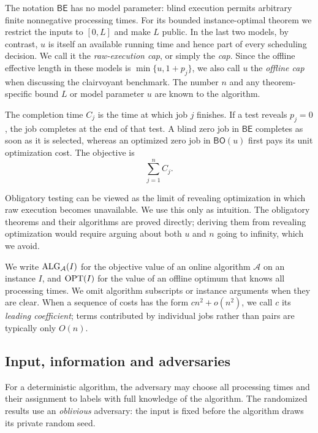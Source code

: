 The notation $\mathsf{BE}$ has no model parameter: blind execution permits
arbitrary finite nonnegative processing times.  For its bounded
instance-optimal theorem we restrict the inputs to $[0,L]$ and make $L$
public.  In the last two models, by contrast, $u$ is itself an available
running time and hence part of every scheduling decision.  We call it the
\emph{raw-execution cap}, or simply the \emph{cap}.  Since the offline
effective length in these models is $\min\{u,1+p_j\}$, we also call $u$ the
\emph{offline cap} when discussing the clairvoyant benchmark.  The
number $n$
and any theorem-specific bound $L$ or model parameter $u$ are known to the
algorithm.

The completion time $C_j$ is the time at which job $j$ finishes.  If a test
reveals $p_j=0$, the job completes at the end of that test.  A blind zero job
in $\mathsf{BE}$ completes as soon as it is selected, whereas an optimized
zero job in $\mathsf{BO}(u)$ first pays its unit optimization cost.  The
objective is
\[
                              \sum_{j=1}^n C_j.
\]

Obligatory testing can be viewed as the limit of revealing optimization in
which raw execution becomes unavailable.  We use this only as intuition.
The obligatory theorems and their algorithms are proved directly; deriving
them from revealing optimization would require arguing about both $u$ and $n$ going to infinity, which we avoid.

We write $\operatorname{ALG}_{\mathcal A}(I)$ for the objective value of an online
algorithm $\mathcal A$ on an instance $I$, and $\operatorname{OPT}(I)$ for the value of an
offline optimum that knows all processing times.  We omit algorithm
subscripts or instance arguments when they are clear.
When a sequence of costs has the form $cn^2+o(n^2)$, we call $c$ its
\emph{leading coefficient}; terms contributed by individual jobs rather
than pairs are typically only $O(n)$.

\subsection{Input, information and adversaries}
\label{par:input-convention}

For a deterministic algorithm, the adversary may choose all processing times
and their assignment to labels with full knowledge of the algorithm.  The
randomized results use an \emph{oblivious} adversary: the input is fixed before
the algorithm draws its private random seed.

